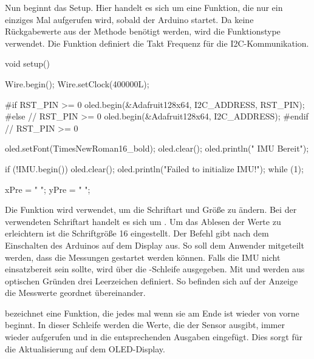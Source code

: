 Nun beginnt das Setup. Hier handelt es sich um eine Funktion, die nur ein einziges Mal aufgerufen wird, sobald der Arduino startet. Da keine Rückgabewerte aus der Methode benötigt werden, wird die Funktionstype  verwendet. Die Funktion  definiert die Takt Frequenz für die I2C-Kommunikation. 

\begin{Arduino}
	void setup() 
	{
		Wire.begin();
		Wire.setClock(400000L);
		
		#if RST_PIN >= 0
		oled.begin(&Adafruit128x64, I2C_ADDRESS, RST_PIN);
		#else   // RST_PIN >= 0
		oled.begin(&Adafruit128x64, I2C_ADDRESS);
		#endif  // RST_PIN >= 0      
		
		oled.setFont(TimesNewRoman16_bold);
		oled.clear();
		oled.println(" IMU Bereit");
		
		if (!IMU.begin()) 
		{
			oled.clear();
			oled.println("Failed to initialize IMU!");
			while (1);
		}
		
		
		xPre = "   ";
		yPre = "   ";
	}
\end{Arduino}

Die Funktion  wird verwendet, um die Schriftart und Größe zu ändern. Bei der verwendeten Schriftart handelt es sich um . Um das Ablesen der Werte zu erleichtern ist die Schriftgröße 16 eingestellt. Der Befehl  gibt nach dem Einschalten des Arduinos auf dem Display  aus. So soll dem Anwender mitgeteilt werden, dass die Messungen gestartet werden können. Falls die IMU nicht einsatzbereit sein sollte, wird über die -Schleife  ausgegeben. Mit  und  werden aus optischen Gründen drei Leerzeichen definiert. So befinden sich auf der Anzeige die Messwerte geordnet übereinander.



  bezeichnet eine Funktion, die jedes mal wenn sie am Ende ist wieder von vorne beginnt. In dieser Schleife werden die Werte, die der Sensor ausgibt, immer wieder aufgerufen und in die entsprechenden Ausgaben eingefügt. Dies sorgt für die Aktualisierung auf dem OLED-Display. 

